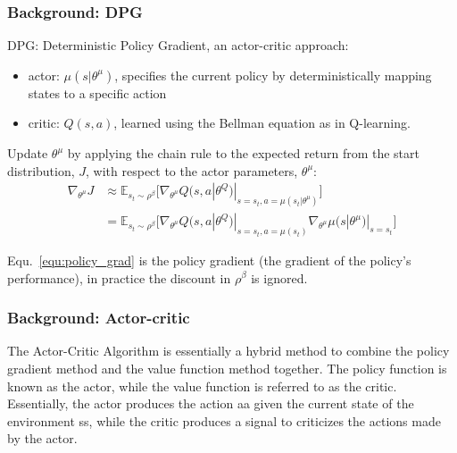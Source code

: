 \begin{frame}
\frametitle{Background: DPG \cite{Silver2014}}

DPG: Deterministic Policy Gradient, an actor-critic approach:
\begin{itemize}
  \item actor: $\mu (s|\theta^{\mu})$,
  specifies the current policy by deterministically mapping states to a specific action
  \item critic: $Q(s, a)$,
  learned using the Bellman equation as in Q-learning.
\end{itemize}


Update $\theta^{\mu}$ by applying the chain rule to the expected return from
the start distribution, $J$, with respect to the actor parameters, $\theta^{\mu}$:
\begin{equation} \label{equ:policy_grad}
\begin{split}
\nabla_{\theta^{\mu}} J &  \approx \mathbb{E}_{s_t \sim \rho^{\beta}} \Big[ \nabla_{\theta^{\mu}} Q(s,a|\theta^Q) |_{s = s_t, a = \mu(s_t|\theta^{\mu})} \Big] \\
  & = \mathbb{E}_{s_t \sim \rho^{\beta}} \Big[ \nabla_{\theta^{\mu}} Q(s,a|\theta^Q) |_{s = s_t, a = \mu(s_t)} \nabla_{\theta^{\mu}} \mu(s|\theta^{\mu})|_{s = s_t} \Big]
\end{split}
\end{equation}

Equ.~\ref{equ:policy_grad} is the policy gradient (the gradient of the policy's performance),
in practice the discount in $\rho^{\beta}$ is ignored.

\end{frame}

\begin{frame}
\frametitle{Background: Actor-critic \cite{Sutton1998}}
The Actor-Critic Algorithm is essentially a hybrid method to combine the policy gradient method and the value function method together.
The policy function is known as the actor, while the value function is referred to as the critic.
Essentially, the actor produces the action aa given the current state of the environment ss, while the critic produces a signal to criticizes the actions made by the actor.
\end{frame}


